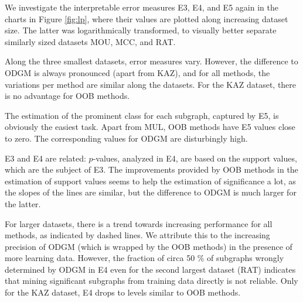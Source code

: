 \documentclass{sig-alternate}
\begin{document}
We investigate the interpretable error measures E3, E4, and E5 again in
the charts in Figure \ref{fig:lp}, where their values are plotted along
increasing dataset size. The latter was logarithmically transformed, to
visually better separate similarly sized datasets MOU, MCC, and RAT. 

Along the three smallest datasets, error measures vary.  However, the difference
to ODGM is always pronounced (apart from KAZ), and for all methods, the variations per method
are similar along the datasets. For the KAZ dataset, there is no advantage for OOB methods.

The estimation of the prominent class for each subgraph, captured by E5, is
obviously the easiest task. Apart from MUL, OOB methods have E5 values close to
zero. The corresponding values for ODGM are disturbingly high.

E3 and E4 are related: $p$-values, analyzed in E4, are based on the support
values, which are the subject of E3.  The improvements provided by OOB methods
in the estimation of support values seems to help the estimation of
significance a lot, as the slopes of the lines are similar, but the difference
to ODGM is much larger for the latter.

For larger datasets, there is a trend towards increasing performance for all
methods, as indicated by dashed lines.
We attribute this to the increasing precision of ODGM (which is wrapped by the
OOB methods) in the presence of more learning data. However, the fraction of
circa 50 \% of subgraphs wrongly determined by ODGM in E4 even for the second
largest dataset (RAT) indicates that mining significant subgraphs from training
data directly is not reliable. Only for the KAZ dataset, E4 drops to levels
similar to OOB methods.



\end{document}
